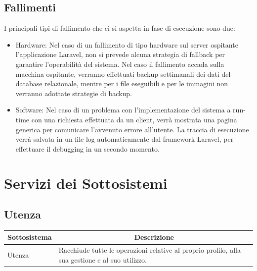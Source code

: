\newpage
\subsection{Fallimenti}
I principali tipi di fallimento che ci si aspetta in fase di esecuzione sono due:
\begin{itemize}
	\item Hardware: Nel caso di un fallimento di tipo hardware sul server ospitante l’applicazione Laravel, non si prevede alcuna strategia di fallback per garantire l’operabilità del sistema. Nel caso il fallimento accada sulla macchina ospitante, verranno effettuati backup settimanali dei dati del database relazionale, mentre per i file eseguibili e per le immagini non verranno adottate strategie di backup.
	\item Software: Nel caso di un problema con l’implementazione del sistema a run-time con una richiesta effettuata da un client, verrà mostrata una pagina generica per comunicare l’avvenuto errore all’utente. La traccia di esecuzione verrà salvata in un file log automaticamente dal framework Laravel, per effettuare il debugging in un secondo momento.
\end{itemize}

\section{Servizi dei Sottosistemi}
\subsection{Utenza}
\begin{center}
	\begin{tabular}{||l | p{22em}||} 
	\hline
	\multicolumn{1}{||c|}{\textbf{Sottosistema}} & \multicolumn{1}{c||}{\textbf{Descrizione}} \\
	\hline\hline
	Utenza & Racchiude tutte le operazioni relative al proprio profilo, alla sua gestione e al suo utilizzo. \\ 
	\hline
   \end{tabular}
\end{center}

